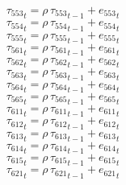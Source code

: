 \begin{dmath}
{{\tau_{553}}}_{t}={{\rho}}\, {{\tau_{553}}}_{t-1}+{{e_{553}}}_{t}
\end{dmath}
\begin{dmath}
{{\tau_{554}}}_{t}={{\rho}}\, {{\tau_{554}}}_{t-1}+{{e_{554}}}_{t}
\end{dmath}
\begin{dmath}
{{\tau_{555}}}_{t}={{\rho}}\, {{\tau_{555}}}_{t-1}+{{e_{555}}}_{t}
\end{dmath}
\begin{dmath}
{{\tau_{561}}}_{t}={{\rho}}\, {{\tau_{561}}}_{t-1}+{{e_{561}}}_{t}
\end{dmath}
\begin{dmath}
{{\tau_{562}}}_{t}={{\rho}}\, {{\tau_{562}}}_{t-1}+{{e_{562}}}_{t}
\end{dmath}
\begin{dmath}
{{\tau_{563}}}_{t}={{\rho}}\, {{\tau_{563}}}_{t-1}+{{e_{563}}}_{t}
\end{dmath}
\begin{dmath}
{{\tau_{564}}}_{t}={{\rho}}\, {{\tau_{564}}}_{t-1}+{{e_{564}}}_{t}
\end{dmath}
\begin{dmath}
{{\tau_{565}}}_{t}={{\rho}}\, {{\tau_{565}}}_{t-1}+{{e_{565}}}_{t}
\end{dmath}
\begin{dmath}
{{\tau_{611}}}_{t}={{\rho}}\, {{\tau_{611}}}_{t-1}+{{e_{611}}}_{t}
\end{dmath}
\begin{dmath}
{{\tau_{612}}}_{t}={{\rho}}\, {{\tau_{612}}}_{t-1}+{{e_{612}}}_{t}
\end{dmath}
\begin{dmath}
{{\tau_{613}}}_{t}={{\rho}}\, {{\tau_{613}}}_{t-1}+{{e_{613}}}_{t}
\end{dmath}
\begin{dmath}
{{\tau_{614}}}_{t}={{\rho}}\, {{\tau_{614}}}_{t-1}+{{e_{614}}}_{t}
\end{dmath}
\begin{dmath}
{{\tau_{615}}}_{t}={{\rho}}\, {{\tau_{615}}}_{t-1}+{{e_{615}}}_{t}
\end{dmath}
\begin{dmath}
{{\tau_{621}}}_{t}={{\rho}}\, {{\tau_{621}}}_{t-1}+{{e_{621}}}_{t}
\end{dmath}
